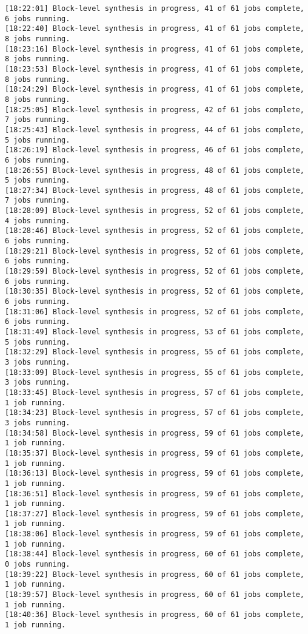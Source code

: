 \begin{center}
\begin{lstlisting}[label=lst:vlog,caption=Файл v++\_vinc.log]
[18:22:01] Block-level synthesis in progress, 41 of 61 jobs complete, 6 jobs running.
[18:22:40] Block-level synthesis in progress, 41 of 61 jobs complete, 8 jobs running.
[18:23:16] Block-level synthesis in progress, 41 of 61 jobs complete, 8 jobs running.
[18:23:53] Block-level synthesis in progress, 41 of 61 jobs complete, 8 jobs running.
[18:24:29] Block-level synthesis in progress, 41 of 61 jobs complete, 8 jobs running.
[18:25:05] Block-level synthesis in progress, 42 of 61 jobs complete, 7 jobs running.
[18:25:43] Block-level synthesis in progress, 44 of 61 jobs complete, 5 jobs running.
[18:26:19] Block-level synthesis in progress, 46 of 61 jobs complete, 6 jobs running.
[18:26:55] Block-level synthesis in progress, 48 of 61 jobs complete, 5 jobs running.
[18:27:34] Block-level synthesis in progress, 48 of 61 jobs complete, 7 jobs running.
[18:28:09] Block-level synthesis in progress, 52 of 61 jobs complete, 4 jobs running.
[18:28:46] Block-level synthesis in progress, 52 of 61 jobs complete, 6 jobs running.
[18:29:21] Block-level synthesis in progress, 52 of 61 jobs complete, 6 jobs running.
[18:29:59] Block-level synthesis in progress, 52 of 61 jobs complete, 6 jobs running.
[18:30:35] Block-level synthesis in progress, 52 of 61 jobs complete, 6 jobs running.
[18:31:06] Block-level synthesis in progress, 52 of 61 jobs complete, 6 jobs running.
[18:31:49] Block-level synthesis in progress, 53 of 61 jobs complete, 5 jobs running.
[18:32:29] Block-level synthesis in progress, 55 of 61 jobs complete, 3 jobs running.
[18:33:09] Block-level synthesis in progress, 55 of 61 jobs complete, 3 jobs running.
[18:33:45] Block-level synthesis in progress, 57 of 61 jobs complete, 1 job running.
[18:34:23] Block-level synthesis in progress, 57 of 61 jobs complete, 3 jobs running.
[18:34:58] Block-level synthesis in progress, 59 of 61 jobs complete, 1 job running.
[18:35:37] Block-level synthesis in progress, 59 of 61 jobs complete, 1 job running.
[18:36:13] Block-level synthesis in progress, 59 of 61 jobs complete, 1 job running.
[18:36:51] Block-level synthesis in progress, 59 of 61 jobs complete, 1 job running.
[18:37:27] Block-level synthesis in progress, 59 of 61 jobs complete, 1 job running.
[18:38:06] Block-level synthesis in progress, 59 of 61 jobs complete, 1 job running.
[18:38:44] Block-level synthesis in progress, 60 of 61 jobs complete, 0 jobs running.
[18:39:22] Block-level synthesis in progress, 60 of 61 jobs complete, 1 job running.
[18:39:57] Block-level synthesis in progress, 60 of 61 jobs complete, 1 job running.
[18:40:36] Block-level synthesis in progress, 60 of 61 jobs complete, 1 job running.

\end{lstlisting}
\end{center}
